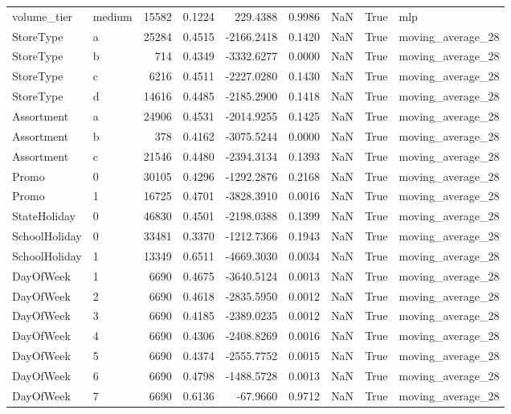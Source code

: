 \begin{table}
\begin{tabular}{llrrrrrrl}
volume\_tier & medium & 15582 & 0.1224 & 229.4388 & 0.9986 & NaN & True & mlp \\
StoreType & a & 25284 & 0.4515 & -2166.2418 & 0.1420 & NaN & True & moving\_average\_28 \\
StoreType & b & 714 & 0.4349 & -3332.6277 & 0.0000 & NaN & True & moving\_average\_28 \\
StoreType & c & 6216 & 0.4511 & -2227.0280 & 0.1430 & NaN & True & moving\_average\_28 \\
StoreType & d & 14616 & 0.4485 & -2185.2900 & 0.1418 & NaN & True & moving\_average\_28 \\
Assortment & a & 24906 & 0.4531 & -2014.9255 & 0.1425 & NaN & True & moving\_average\_28 \\
Assortment & b & 378 & 0.4162 & -3075.5244 & 0.0000 & NaN & True & moving\_average\_28 \\
Assortment & c & 21546 & 0.4480 & -2394.3134 & 0.1393 & NaN & True & moving\_average\_28 \\
Promo & 0 & 30105 & 0.4296 & -1292.2876 & 0.2168 & NaN & True & moving\_average\_28 \\
Promo & 1 & 16725 & 0.4701 & -3828.3910 & 0.0016 & NaN & True & moving\_average\_28 \\
StateHoliday & 0 & 46830 & 0.4501 & -2198.0388 & 0.1399 & NaN & True & moving\_average\_28 \\
SchoolHoliday & 0 & 33481 & 0.3370 & -1212.7366 & 0.1943 & NaN & True & moving\_average\_28 \\
SchoolHoliday & 1 & 13349 & 0.6511 & -4669.3030 & 0.0034 & NaN & True & moving\_average\_28 \\
DayOfWeek & 1 & 6690 & 0.4675 & -3640.5124 & 0.0013 & NaN & True & moving\_average\_28 \\
DayOfWeek & 2 & 6690 & 0.4618 & -2835.5950 & 0.0012 & NaN & True & moving\_average\_28 \\
DayOfWeek & 3 & 6690 & 0.4185 & -2389.0235 & 0.0012 & NaN & True & moving\_average\_28 \\
DayOfWeek & 4 & 6690 & 0.4306 & -2408.8269 & 0.0016 & NaN & True & moving\_average\_28 \\
DayOfWeek & 5 & 6690 & 0.4374 & -2555.7752 & 0.0015 & NaN & True & moving\_average\_28 \\
DayOfWeek & 6 & 6690 & 0.4798 & -1488.5728 & 0.0013 & NaN & True & moving\_average\_28 \\
DayOfWeek & 7 & 6690 & 0.6136 & -67.9660 & 0.9712 & NaN & True & moving\_average\_28 \\

\end{tabular}
\end{table}
